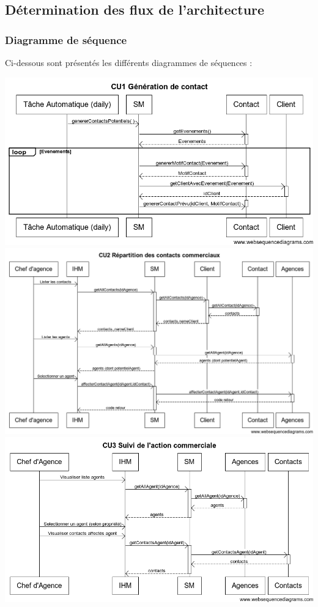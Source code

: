 \subsection{Détermination des flux de l'architecture}

\subsubsection{Diagramme de séquence}

Ci-dessous sont présentés les différents diagrammes de séquences :
\begin {center}
\includegraphics[width=\textwidth]{../../webSequenceDiagrameSources/cu1.png}
\includegraphics[width=\textwidth]{../../webSequenceDiagrameSources/cu2.png}
\includegraphics[width=\textwidth]{../../webSequenceDiagrameSources/cu3.png}

\end{center}
